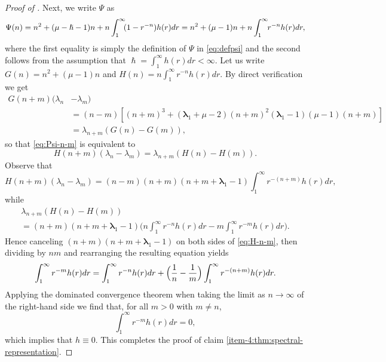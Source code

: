 \documentclass[10pt]{amsart}
\theoremstyle{plain}
\theoremstyle{definition}
\newcommand{\lam}{{\bm{\lambda}_1}}
\let\h\hslash
\let\mo\mu
\begin{document}
\begin{proof}[Proof of ]
Next, we write $\Psi$ as
\begin{equation*}
\Psi(n) = n^2 + (\mo-\h-1)n + n \int_1^\infty\hspace*{-1mm} (1-r^{-n})h(r)dr = n^2 + (\mo-1)n + n\int_1^\infty\hspace*{-1mm} r^{-n}h(r)dr,
\end{equation*}
where the first equality is simply the definition of $\Psi$ in \eqref{eq:defpsi} and the second follows from the assumption that $\h = \int_1^\infty h(r) dr < \infty$. Let us write $G(n) = n^2+(\mo-1)n$ and $H(n) = n\int_1^\infty r^{-n}h(r)dr$. By direct verification we get
\begin{align*}
G(n+m)(\lambda_n&-\lambda_m)\\
 &= (n-m)\left[(n+m)^3+(\lam + \mo-2)(n+m)^2 (\lam-1)(\mo-1)(n+m)\right] \\
&= \lambda_{n+m}(G(n)-G(m)),
\end{align*}
so that \eqref{eq:Psi-n-m} is equivalent to
\begin{equation}
\label{eq:H-n-m}
H(n+m)(\lambda_n-\lambda_m) = \lambda_{n+m}(H(n)-H(m)).
\end{equation}
Observe that
\begin{equation*}
H(n+m)\left(\lambda_n-\lambda_m\right) = (n-m)(n+m)\left(n+m+\lam-1\right) \int_1^\infty r^{-(n+m)}h(r)dr,
\end{equation*}
while
\begin{multline*}
\lambda_{n+m}\left(H(n)-H(m)\right)\\[-5pt]
= (n+m)(n+m+\lam-1)\biggl(n\int_1^\infty r^{-n}h(r)dr - m\int_1^\infty r^{-m}h(r)dr \biggr).
\end{multline*}
Hence canceling $(n+m)(n+m+\lam-1)$ on both sides of \eqref{eq:H-n-m}, then dividing by $nm$ and rearranging the resulting equation yields
\begin{equation*}
\int_1^\infty r^{-m} h(r)dr = \int_1^\infty r^{-n}h(r)dr + \Bigl(\frac{1}{n}-\frac{1}{m}\Bigr) \int_1^\infty r^{-(n+m)} h(r)dr.
\end{equation*}
Applying the dominated convergence theorem when taking the limit as $n \to \infty$ of the right-hand side we find that, for all $m > 0$ with $m \neq n$,
\begin{equation*}
\int_1^\infty r^{-m} h(r)dr = 0,
\end{equation*}
which implies that $h \equiv 0$. This completes the proof of claim \eqref{item-4:thm:spectral-representation}.\end{proof}
\end{document}
